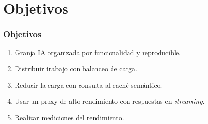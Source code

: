 \section{Objetivos}
\begin{frame}
\frametitle{Objetivos}
\begin{enumerate}
    \item Granja IA organizada por funcionalidad y reproducible.
    
    \item Distribuir trabajo con balanceo de carga.
    
    \item Reducir la carga con consulta al caché semántico.
    
    \item Usar un proxy de alto rendimiento con respuestas en \emph{streaming}.
    
    \item Realizar mediciones del rendimiento.
\end{enumerate}
\end{frame}

